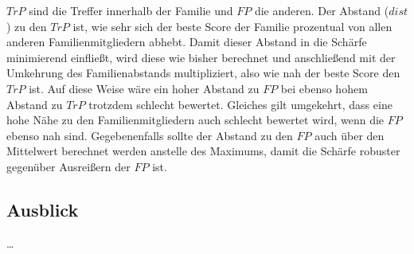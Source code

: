     $TrP$ sind die Treffer innerhalb der Familie und $FP$ die anderen. Der Abstand ($dist$) zu den $TrP$ ist, wie sehr sich der beste Score der Familie prozentual von allen anderen Familienmitgliedern abhebt. Damit dieser Abstand in die Schärfe minimierend einfließt, wird diese wie bisher berechnet und anschließend mit der Umkehrung des Familienabstands multipliziert, also wie nah der beste Score den $TrP$ ist. Auf diese Weise wäre ein hoher Abstand zu $FP$ bei ebenso hohem Abstand zu $TrP$ trotzdem schlecht bewertet. Gleiches gilt umgekehrt, dass eine hohe Nähe zu den Familienmitgliedern auch schlecht bewertet wird, wenn die $FP$ ebenso nah sind. Gegebenenfalls sollte der Abstand zu den $FP$ auch über den Mittelwert berechnet werden anstelle des Maximums, damit die Schärfe robuster gegenüber Ausreißern der $FP$ ist.

    \subsection*{Ausblick} %
        \label{sub:ausblick}
        \dots
    
